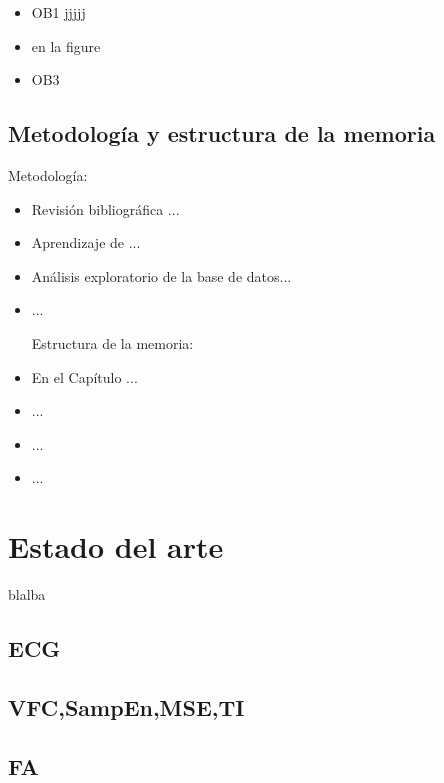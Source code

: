 \documentclass[12pt,a4paper,Spanish]{book}
\begin{document}
\begin{itemize}
\item OB1 jjjjj	

\item  en la figure

\item OB3
\end{itemize}

\section{Metodología y estructura de la memoria}

Metodología:

\begin{itemize}

\item Revisión bibliográfica ...

\item Aprendizaje de ...
\item Análisis exploratorio de la base de datos...\cite{veterinaria}

\item ...

Estructura de la memoria:

\item En el Capítulo ...

\item ...

\item ...

\item ...

\end{itemize}

\chapter{Estado del arte}\label{Estado del arte}
blalba \cite{yang2006music}
\section{ECG}



\section{VFC,SampEn,MSE,TI}
\section{FA}
\end{document}
